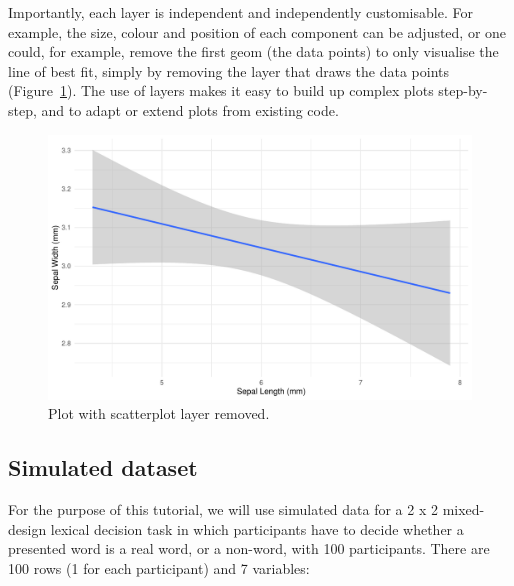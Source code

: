 \documentclass[
  english,
  doc,floatsintext]{apa6}
\begin{document}
Importantly, each layer is independent and independently customisable. For example, the size, colour and position of each component can be adjusted, or one could, for example, remove the first geom (the data points) to only visualise the line of best fit, simply by removing the layer that draws the data points (Figure~\ref{fig:remove-layer}). The use of layers makes it easy to build up complex plots step-by-step, and to adapt or extend plots from existing code.

\begin{figure}

{\centering \includegraphics[width=1\linewidth]{images/remove-layer-1} 

}

\caption{Plot with scatterplot layer removed.}\label{fig:remove-layer}
\end{figure}

\hypertarget{simulated-dataset}{%
\subsection{Simulated dataset}\label{simulated-dataset}}

For the purpose of this tutorial, we will use simulated data for a 2 x 2 mixed-design lexical decision task in which participants have to decide whether a presented word is a real word, or a non-word, with 100 participants. There are 100 rows (1 for each participant) and 7 variables:
\end{document}
